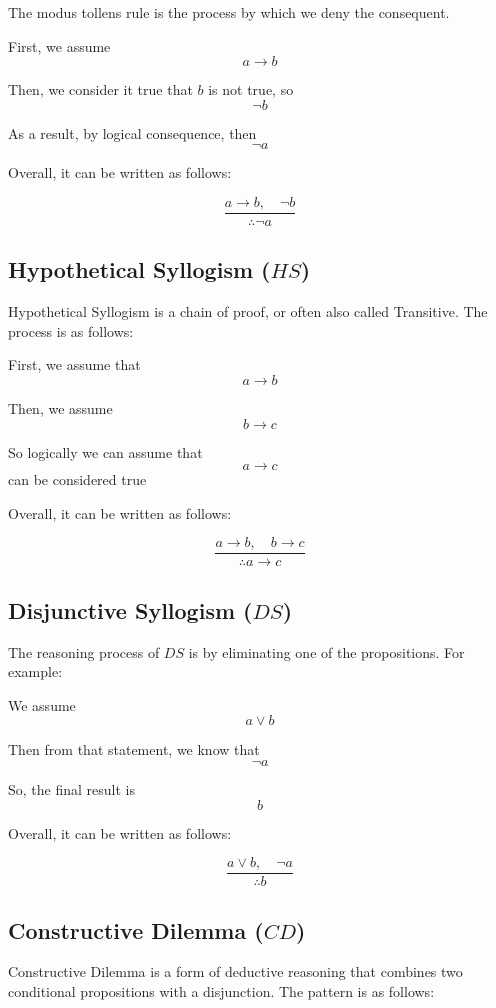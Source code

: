 \documentclass[12pt,a4paper,openany]{article}
\begin{document}
The modus tollens rule is the process by which we deny the consequent.

First, we assume \[a \rightarrow b\]

Then, we consider it true that \(b\) is not true, so \[\neg b\]

As a result, by logical consequence, then \[\neg a\]

Overall, it can be written as follows:

\[\frac{a \rightarrow b, \quad \neg b}{\therefore \neg a}\]

\subsection{Hypothetical Syllogism (\(HS\))}\label{hypothetical-syllogism-hs}

Hypothetical Syllogism is a chain of proof, or often also called Transitive. The process is as follows:

First, we assume that \[a \rightarrow b\]

Then, we assume \[b \rightarrow c\]

So logically we can assume that \[a \rightarrow c\] can be considered true

Overall, it can be written as follows:

\[\frac{a \rightarrow b, \quad b \rightarrow c}{\therefore a \rightarrow c}\]

\subsection{Disjunctive Syllogism (\(DS\))}\label{disjunctive-syllogism-ds}

The reasoning process of \(DS\) is by eliminating one of the propositions. For example:

We assume \[a \lor b\]

Then from that statement, we know that \[\neg a\]

So, the final result is \[b\]

Overall, it can be written as follows:

\[\frac{a \lor b, \quad \neg a}{\therefore b}\]

\subsection{Constructive Dilemma (\(CD\))}\label{constructive-dilemma-cd}

Constructive Dilemma is a form of deductive reasoning that combines two conditional propositions with a disjunction. The pattern is as follows:
\end{document}
